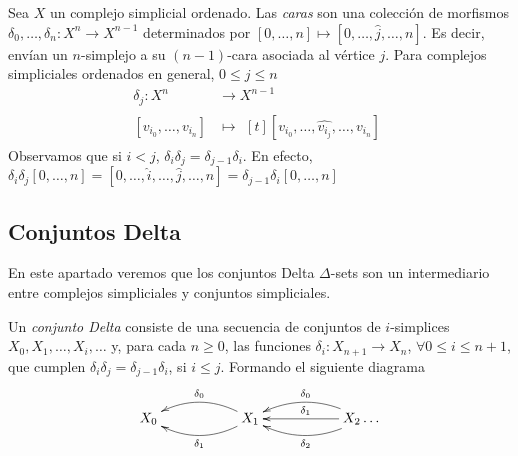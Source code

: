 \documentclass[../main.tex]{subfiles}
\begin{document}
\begin{defi}
    Sea $X$ un complejo simplicial ordenado. Las \emph{caras} son una colecci\'on de morfismos $\delta_0,\dots,\delta_n\colon X^n\to X^{n-1}$ determinados por $[0,\dots,n] \mapsto [0,\dots,\hat{j},\dots,n]$. Es decir, env\'ian un $n$-simplejo a su $(n-1)$-cara asociada al v\'ertice $j$.
    Para complejos simpliciales ordenados en general, $0\le j \le n$
    \begin{align*}
        \delta_j: X^n           & \longrightarrow X^{n-1} \\
        [v_{i_0},\dots,v_{i_n}] & \longmapsto\!
        \begin{aligned}[t]
            [v_{i_0},\dots,\hat{v_{i_j}},\dots,v_{i_n}]
        \end{aligned}
    \end{align*}
    Observamos que si $i<j$, $\delta_i\delta_j = \delta_{j-1}\delta_{i}$. En efecto, $\delta_i\delta_j[0,\dots,n] = [0,\dots,\hat{i},\dots,\hat{j},\dots,n] = \delta_{j-1}\delta_{i}[0,\dots,n]$
\end{defi}


\subsection{Conjuntos Delta}
En este apartado veremos que los conjuntos Delta $\Delta$-sets son un intermediario entre complejos simpliciales y conjuntos simpliciales.
\begin{defi}
    Un \emph{conjunto Delta} consiste de una secuencia de conjuntos de $i$-simplices $X_0,X_1,\dots,X_i,\dots$ y, para cada $n\ge 0$, las funciones $\delta_i: X_{n+1} \to X_n$, $\forall 0\le i \le n+1$, que cumplen $\delta_i\delta_j = \delta_{j-1}\delta_{i}$, si $i\le j$.
    Formando el siguiente diagrama
    $$
        \xymatrix{
        X_0  & & X_1  \ar@/{}_{1pc}/[ll]_{\delta_0} \ar@/{}^{1pc}/[ll]^{\delta_1} & & X_2 \ar@/{}_{1pc}/[ll]_{\delta_0} \ar@/{}^{1pc}/[ll]^{\delta_2} \ar[ll]_{\delta_1} \dots
        }
    $$
\end{defi}
\end{document}
